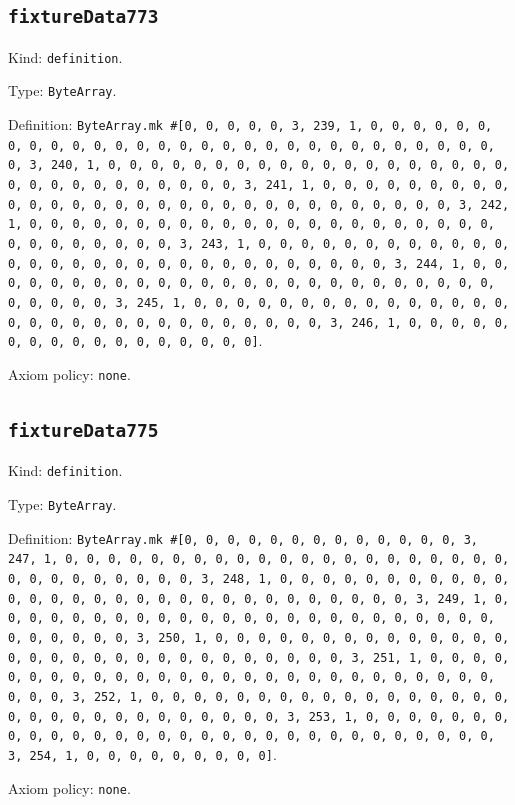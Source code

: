 \documentclass[11pt]{article}
\begin{document}
\subsection*{\texttt{fixtureData773}}
\noindent Kind: \texttt{definition}.\par
\noindent Type: \texttt{ByteArray}.\par
\noindent Definition: \texttt{ByteArray.mk \#[0, 0, 0, 0, 0, 3, 239, 1, 0, 0, 0, 0, 0, 0, 0, 0, 0, 0, 0, 0, 0, 0, 0, 0, 0, 0, 0, 0, 0, 0, 0, 0, 0, 0, 0, 0, 0, 0, 3, 240, 1, 0, 0, 0, 0, 0, 0, 0, 0, 0, 0, 0, 0, 0, 0, 0, 0, 0, 0, 0, 0, 0, 0, 0, 0, 0, 0, 0, 0, 0, 0, 3, 241, 1, 0, 0, 0, 0, 0, 0, 0, 0, 0, 0, 0, 0, 0, 0, 0, 0, 0, 0, 0, 0, 0, 0, 0, 0, 0, 0, 0, 0, 0, 0, 3, 242, 1, 0, 0, 0, 0, 0, 0, 0, 0, 0, 0, 0, 0, 0, 0, 0, 0, 0, 0, 0, 0, 0, 0, 0, 0, 0, 0, 0, 0, 0, 0, 3, 243, 1, 0, 0, 0, 0, 0, 0, 0, 0, 0, 0, 0, 0, 0, 0, 0, 0, 0, 0, 0, 0, 0, 0, 0, 0, 0, 0, 0, 0, 0, 0, 3, 244, 1, 0, 0, 0, 0, 0, 0, 0, 0, 0, 0, 0, 0, 0, 0, 0, 0, 0, 0, 0, 0, 0, 0, 0, 0, 0, 0, 0, 0, 0, 0, 3, 245, 1, 0, 0, 0, 0, 0, 0, 0, 0, 0, 0, 0, 0, 0, 0, 0, 0, 0, 0, 0, 0, 0, 0, 0, 0, 0, 0, 0, 0, 0, 0, 3, 246, 1, 0, 0, 0, 0, 0, 0, 0, 0, 0, 0, 0, 0, 0, 0, 0, 0, 0]}.\par
\noindent Axiom policy: \texttt{none}.\par
\subsection*{\texttt{fixtureData775}}
\noindent Kind: \texttt{definition}.\par
\noindent Type: \texttt{ByteArray}.\par
\noindent Definition: \texttt{ByteArray.mk \#[0, 0, 0, 0, 0, 0, 0, 0, 0, 0, 0, 0, 0, 3, 247, 1, 0, 0, 0, 0, 0, 0, 0, 0, 0, 0, 0, 0, 0, 0, 0, 0, 0, 0, 0, 0, 0, 0, 0, 0, 0, 0, 0, 0, 0, 0, 3, 248, 1, 0, 0, 0, 0, 0, 0, 0, 0, 0, 0, 0, 0, 0, 0, 0, 0, 0, 0, 0, 0, 0, 0, 0, 0, 0, 0, 0, 0, 0, 0, 3, 249, 1, 0, 0, 0, 0, 0, 0, 0, 0, 0, 0, 0, 0, 0, 0, 0, 0, 0, 0, 0, 0, 0, 0, 0, 0, 0, 0, 0, 0, 0, 0, 3, 250, 1, 0, 0, 0, 0, 0, 0, 0, 0, 0, 0, 0, 0, 0, 0, 0, 0, 0, 0, 0, 0, 0, 0, 0, 0, 0, 0, 0, 0, 0, 0, 3, 251, 1, 0, 0, 0, 0, 0, 0, 0, 0, 0, 0, 0, 0, 0, 0, 0, 0, 0, 0, 0, 0, 0, 0, 0, 0, 0, 0, 0, 0, 0, 0, 3, 252, 1, 0, 0, 0, 0, 0, 0, 0, 0, 0, 0, 0, 0, 0, 0, 0, 0, 0, 0, 0, 0, 0, 0, 0, 0, 0, 0, 0, 0, 0, 0, 3, 253, 1, 0, 0, 0, 0, 0, 0, 0, 0, 0, 0, 0, 0, 0, 0, 0, 0, 0, 0, 0, 0, 0, 0, 0, 0, 0, 0, 0, 0, 0, 0, 3, 254, 1, 0, 0, 0, 0, 0, 0, 0, 0, 0]}.\par
\noindent Axiom policy: \texttt{none}.\par
\end{document}
